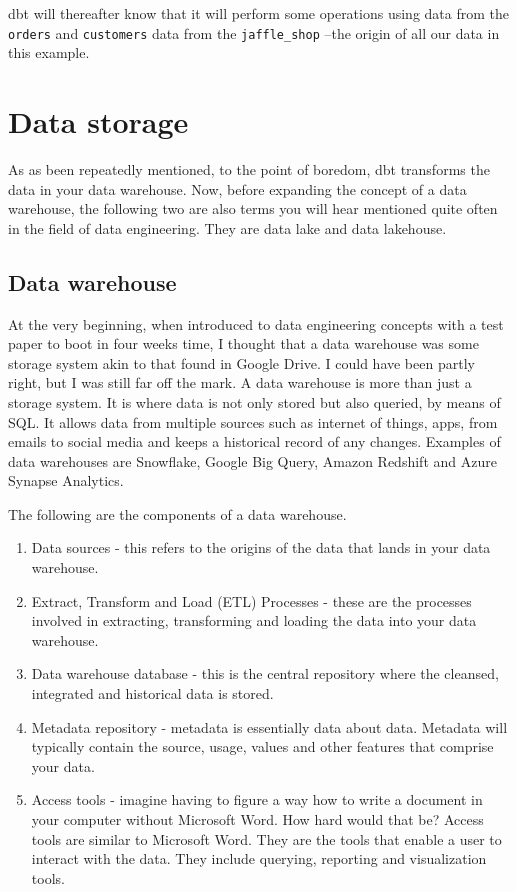 \documentclass[
]{book}
\begin{document}
dbt will thereafter know that it will perform some operations using data from the \texttt{orders} and \texttt{customers} data from the \texttt{jaffle\_shop} --the origin of all our data in this example.

\hypertarget{data-storage}{%
\chapter{Data storage}\label{data-storage}}

As as been repeatedly mentioned, to the point of boredom, dbt transforms the data in your data warehouse. Now, before expanding the concept of a data warehouse, the following two are also terms you will hear mentioned quite often in the field of data engineering. They are data lake and data lakehouse.

\hypertarget{data-warehouse}{%
\section{Data warehouse}\label{data-warehouse}}

At the very beginning, when introduced to data engineering concepts with a test paper to boot in four weeks time, I thought that a data warehouse was some storage system akin to that found in Google Drive. I could have been partly right, but I was still far off the mark. A data warehouse is more than just a storage system. It is where data is not only stored but also queried, by means of SQL. It allows data from multiple sources such as internet of things, apps, from emails to social media and keeps a historical record of any changes. Examples of data warehouses are Snowflake, Google Big Query, Amazon Redshift and Azure Synapse Analytics.

The following are the components of a data warehouse.

\begin{enumerate}
\def\labelenumi{\arabic{enumi}.}
\item
  Data sources - this refers to the origins of the data that lands in your data warehouse.
\item
  Extract, Transform and Load (ETL) Processes - these are the processes involved in extracting, transforming and loading the data into your data warehouse.
\item
  Data warehouse database - this is the central repository where the cleansed, integrated and historical data is stored.
\item
  Metadata repository - metadata is essentially data about data. Metadata will typically contain the source, usage, values and other features that comprise your data.
\item
  Access tools - imagine having to figure a way how to write a document in your computer without Microsoft Word. How hard would that be? Access tools are similar to Microsoft Word. They are the tools that enable a user to interact with the data. They include querying, reporting and visualization tools.
\end{enumerate}
\end{document}
